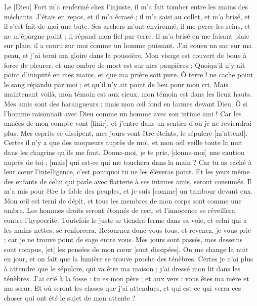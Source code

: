 \begin{multicols}{2}
Le [Dieu] Fort m'a renfermé chez l'injuste, il m'a fait tomber entre les mains des méchants.
J'étais en repos, et il m'a écrasé ; il m'a saisi au collet, et m'a brisé, et il s'est fait de moi une bute.
Ses archers m'ont environné, il me perce les reins, et ne m'épargne point ; il répand mon fiel par terre.
Il m'a brisé en me faisant plaie sur plaie, il a couru sur moi comme un homme puissant.
J'ai cousu un sac sur ma peau, et j'ai terni ma gloire dans la poussière.
Mon visage est couvert de boue à force de pleurer, et une ombre de mort est sur mes paupières ;
Quoiqu'il n'y ait point d'iniquité en mes mains, et que ma prière soit pure.
Ô terre ! ne cache point le sang répandu par moi ; et qu'il n'y ait point de lieu pour mon cri.
Mais maintenant voilà, mon témoin est aux cieux, mon témoin est dans les lieux hauts.
Mes amis sont des harangueurs ; mais mon œil fond en larmes devant Dieu.
Ô si l'homme raisonnait avec Dieu comme un homme avec son intime ami !
Car les années de mon compte vont [finir], et j'entre dans un sentier d'où je ne reviendrai plus.
\VerseOne{}Mes esprits se dissipent, mes jours vont être éteints, le sépulcre [m'attend].
Certes il n'y a que des moqueurs auprès de moi, et mon œil veille toute la nuit dans les chagrins qu'ils me font.
Donne-moi, je te prie, [donne-moi] une caution auprès de toi ; [mais] qui est-ce qui me touchera dans la main ?
Car tu as caché à leur cœur l'intelligence, c'est pourquoi tu ne les élèveras point.
Et les yeux même des enfants de celui qui parle avec flatterie à ses intimes amis, seront consumés.
Il m'a mis pour être la fable des peuples, et je suis [comme] un tambour devant eux.
Mon œil est terni de dépit, et tous les membres de mon corps sont comme une ombre.
Les hommes droits seront étonnés de ceci, et l'innocence se réveillera contre l'hypocrite.
Toutefois le juste se tiendra ferme dans sa voie, et celui qui a les mains nettes, se renforcera.
Retournez donc vous tous, et revenez, je vous prie ; car je ne trouve point de sage entre vous.
Mes jours sont passés, mes desseins sont rompus, [et] les pensées de mon cœur [sont dissipées].
On me change la nuit en jour, et on fait que la lumière se trouve proche des ténèbres.
Certes je n'ai plus à attendre que le sépulcre, qui va être ma maison ; j'ai dressé mon lit dans les ténèbres.
J'ai crié à la fosse : tu es mon père ; et aux vers : vous êtes ma mère et ma sœur.
Et où seront les choses que j'ai attendues, et qui est-ce qui verra ces choses qui ont été le sujet de mon attente ?

\end{multicols}
